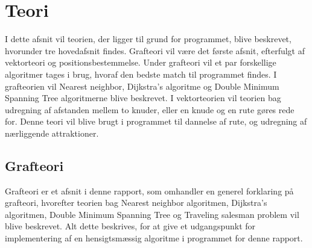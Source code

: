 \chapter{Teori}
I dette afsnit vil teorien, der ligger til grund for programmet, blive beskrevet, hvorunder tre hovedafsnit findes. Grafteori vil være det første afsnit, efterfulgt af vektorteori og  positionsbestemmelse. Under grafteori vil et par forskellige algoritmer tages i brug, hvoraf den bedste match til programmet findes. I grafteorien vil Nearest neighbor, Dijkstra’s algoritme og Double Minimum Spanning Tree algoritmerne blive beskrevet. I vektorteorien vil teorien bag udregning af afstanden mellem to knuder, eller en knude og en rute gøres rede for. Denne teori vil blive brugt i programmet til dannelse af rute, og udregning af nærliggende attraktioner.

\section{Grafteori}
Grafteori er et afsnit i denne rapport, som omhandler en generel forklaring på grafteori, hvorefter teorien bag Nearest neighbor algoritmen, Dijkstra’s algoritmen, Double Minimum Spanning Tree og Traveling salesman problem vil blive beskrevet. Alt dette beskrives, for at give et udgangspunkt for implementering af en hensigtsmæssig algoritme i programmet for denne rapport.

